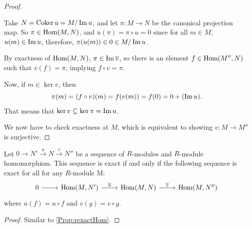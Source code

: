 \begin{proof}
\begin{enumerate}[label=\emph{Step \arabic*}. , leftmargin=*]
        Take  \( N = \operatorname{Coker} u = M / \operatorname{Im} u\), and let  \( \pi: M \to N \) be the canonical projection map. So \( \pi \in \operatorname{Hom}(M,N) \), and \(\overline{u}(\pi) = \pi \circ u = 0 \) since for all \( m \in M \),  \( u(m) \in \operatorname{Im} u \), therefore,  \( \pi(u(m)) \in 0 \in M / \operatorname{Im} u \). 

        By exactness of \( \operatorname{Hom}(M, N) \),  \( \pi \in \operatorname{Im} \overline{v} \), so there is an element \( f \in \operatorname{Hom}(M'', N) \) such that  \( \overline{v}(f) = \pi \), implying \( f \circ v = \pi \).

        Now, if \( m \in \ker v \), then
        \[
            \pi(m) = (f\circ v)(m) = f(v(m)) = f(0) = 0 + (\operatorname{Im} u).
        \]
        That means that \( \ker v \subseteq \ker \pi = \operatorname{Im} u\).
    \end{enumerate}
    We now have to check exactness at \( M \), which is equivalent to showing  \( v: M \to M'' \) is surjective. 
\end{proof}
\begin{proposition}
    Let \( 0 \to N' \xrightarrow{u} N \xrightarrow{v} N''\) be a sequence of  \( R \)-modules and  \( R \)-module homomorphism. This sequence is exact if and only if the following sequence is exact for all for any  \( R \)-module  M:
\[\begin{tikzcd}
	0 & {\operatorname{Hom}(M, N')} & {\operatorname{Hom}(M, N)} & {\operatorname{Hom}(M, N'')}
	\arrow[from=1-1, to=1-2]
	\arrow["{\overline{u}}", from=1-2, to=1-3]
	\arrow["{\overline{v}}", from=1-3, to=1-4]
\end{tikzcd}\]
where \( \overline{u}(f) = u \circ f \) and \( \overline{v}(g) = v \circ g \).
\end{proposition}
\begin{proof}
    Similar to \autoref{Prop:rexactHom}.
\end{proof}
